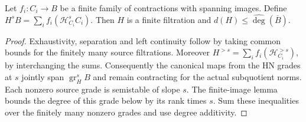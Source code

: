 \begin{lemma}
\label{lem:finite-hn-image-degree}
\leanok
Let $f_i:C_i\to B$ be a finite family of contractions with spanning
images. Define $H^sB=\sum_i f_i(\mathcal H_{C_i}^s C_i)$. Then
$H$ is a finite filtration and $d(H)\le\widehat{\deg}(\overline B)$.
\end{lemma}
\begin{proof}
Exhaustivity, separation and left continuity follow by taking common
bounds for the finitely many source filtrations. Moreover
$H^{>s}=\sum_i f_i(\mathcal H_{C_i}^{>s})$, by interchanging the sums.
Consequently the canonical maps from the HN grades at $s$ jointly span
$\operatorname{gr}_H^s B$ and remain contracting for the actual
subquotient norms. Each nonzero source grade is semistable of slope $s$.
The finite-image lemma bounds the degree of this grade below by its
rank times $s$. Sum these inequalities over the finitely many nonzero
grades and use degree additivity.
\end{proof}

